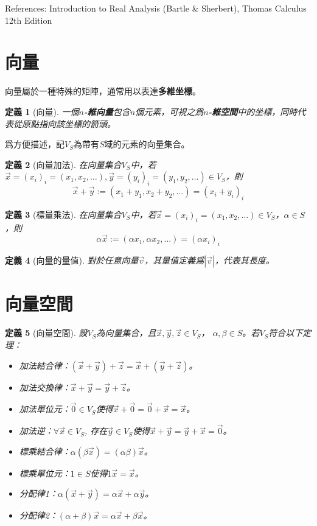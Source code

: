 \documentclass[12pt]{article}
\newtheorem{definition}{定義}
\begin{document}
    References: Introduction to Real Analysis (Bartle \& Sherbert), Thomas Calculus 12th Edition
    \section*{向量}

    向量屬於一種特殊的矩陣，通常用以表達\textbf{多維坐標}。

    \begin{definition}[向量]
        一個\textbf{$n$-維向量}包含$n$個元素，可視之爲\textbf{$n$-維空間}中的坐標，同時代表從原點指向該坐標的箭頭。
    \end{definition}
    
    爲方便描述，記$V_S$為帶有$S$域的元素的向量集合。

    \begin{definition}[向量加法]
        在向量集合$V_S$中，若$\vec{x}=(x_i)_i=(x_1,x_2,\dots),\vec{y}=(y_i)_i=(y_1,y_2,\dots)\in V_S$，則$$\vec{x}+\vec{y}:=(x_1+y_1,x_2+y_2,\dots)=(x_i+y_i)_i$$
    \end{definition}

    \begin{definition}[標量乘法]
        在向量集合$V_S$中，若$\vec{x}=(x_i)_i=(x_1,x_2,\dots)\in V_S$，$\alpha \in S$，則$$\alpha \vec{x}:=(\alpha x_1,\alpha x_2,\dots)=(\alpha x_i)_i$$
    \end{definition}

    \begin{definition}[向量的量值]
        對於任意向量$\vec{v}$，其量值定義爲$|\vec{v}|$，代表其長度。
    \end{definition}
    \section*{向量空間}

    \begin{definition}[向量空間]
        設$V_S$為向量集合，且$\vec{x},\vec{y},\vec{z}\in V_S$， $\alpha, \beta \in S$。若$V_S$符合以下定理：\begin{itemize}
            \item 加法結合律：$(\vec{x}+\vec{y})+\vec{z}=\vec{x}+(\vec{y}+\vec{z})$。
            \item 加法交換律：$\vec{x}+\vec{y}=\vec{y}+\vec{z}$。
            \item 加法單位元：$\vec{0}\in V_S$使得$\vec{x}+\vec{0}=\vec{0}+\vec{x}=\vec{x}$。
            \item 加法逆：$\forall \vec{x}\in V_S$, 存在$\vec{y}\in V_S$使得$\vec{x}+\vec{y}=\vec{y}+\vec{x}=\vec{0}$。
            \item 標乘結合律：$\alpha(\beta \vec{x})=(\alpha\beta)\vec{x}$。
            \item 標乘單位元：$1\in S$使得$1\vec{x}=\vec{x}$。
            \item 分配律1：$\alpha(\vec{x}+\vec{y})=\alpha\vec{x}+\alpha\vec{y}$。
            \item 分配律2：$(\alpha+\beta)\vec{x}=\alpha\vec{x}+\beta\vec{x}$。
        \end{itemize}
    \end{definition}
\end{document}
